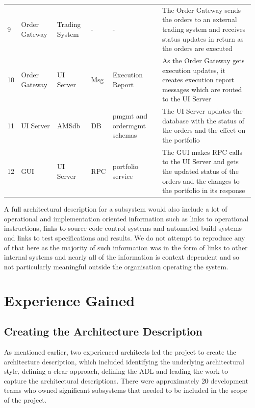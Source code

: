 \begin{table}
\begin{tabular}{| p{0.5cm} p{2cm} p{2cm} l p{2cm} p{4.9cm} |}
9 & Order Gateway & Trading System & - & - & The Order Gateway sends the orders to an external trading system and receives status updates in return as the orders are executed \\

10 & Order Gateway & UI Server & Msg & Execution Report & As the Order Gateway gets execution updates, it creates execution report messages which are routed to the UI Server \\

11 & UI Server & AMSdb & DB & pmgmt and ordermgmt schemas & The UI Server updates the database with the status of the orders and the effect on the portfolio \\

12 & GUI & UI Server & RPC & portfolio service & The GUI makes RPC calls to the UI Server and gets the updated status of the orders and the changes to the portfolio in its response \\
\hline
\end{tabular}
\end{table}

  A full architectural description for a subsystem would also include a lot of operational and implementation oriented information such as links to operational instructions, links to source code control systems and automated build systems and links to test specifications and results.  We do not attempt to reproduce any of that here as the majority of such information was in the form of links to other internal systems and nearly all of the information is context dependent and so not particularly meaningful outside the organisation operating the system.

\section{Experience Gained}

\subsection{Creating the Architecture Description}

  As mentioned earlier, two experienced architects led the project to create the architecture description, which included identifying the underlying architectural style, defining a clear approach, defining the ADL and leading the work to capture the architectural descriptions.  There were approximately 20 development teams who owned significant subsystems that needed to be included in the scope of the project.

